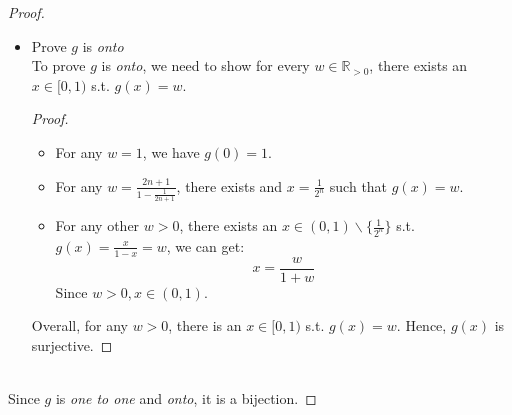 \documentclass{article}
\begin{document}
\begin{proof}
\begin{itemize}
\begin{proof}
            \\
            If \( x_1, x_2 \notin \left\{ \frac{1}{2^n} \right\} \), then \( g(x_1) = \frac{x_1}{1 - x_1} \) and \( g(x_2) = \frac{x_2}{1 - x_2} \).
            Since \( x_1 \neq x_2 \), \( \frac{x_1}{1 - x_1} \neq \frac{x_2}{1 - x_2} \). Hence, \( g(x_1) \neq g(x_2) \).
            \\
            Combining all cases, $g(x)$ is injective.
        \end{proof}
        \item Prove $g$ is \textit{onto}
        \\
        To prove $g$ is \textit{onto}, we need to show for every $w \in \mathbb{R}_{>0}$, there exists an $x \in [0,1)$ s.t. $g(x) = w$.
        \begin{proof}
            \begin{itemize}
                \item For any $w = 1$, we have $g(0) = 1$.
                \item For any $w = \frac{2n+1}{1-\frac{1}{2n+1}}$, there exists and $x = \frac{1}{2^n}$ such that $g(x) = w$.
                \item For any other $w > 0$, there exists an $x \in (0,1) \backslash \{\frac{1}{2^n}\}$ s.t. $g(x) = \frac{x}{1 - x} = w$, we can get:
                \[ x = \frac{w}{1 + w} \]
                Since $w > 0, x \in (0,1)$.
            \end{itemize}
            Overall, for any $w > 0$, there is an $x \in [0,1)$ s.t. $g(x) = w$. Hence, $g(x)$ is surjective.
        \end{proof}
    \end{itemize}
    \\
    Since $g$ is \textit{one to one} and \textit{onto}, it is a bijection.
\end{proof}
\end{document}

